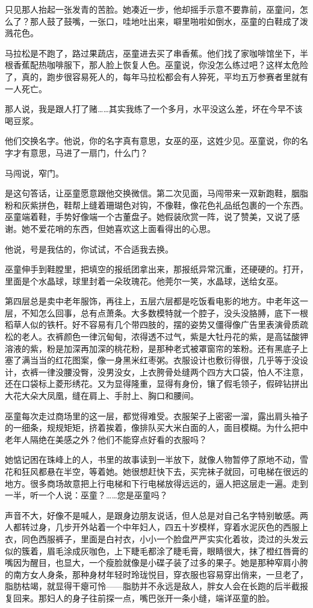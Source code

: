 \documentclass[lang=cn,newtx,12pt,scheme=chinese]{elegantbook}
\begin{document}
只见那人抬起一张发青的苦脸。她凑近一步，他却摇手示意不要靠前，巫童问，怎么了？那人鼓了鼓嘴，一张口，哇地吐出来，噼里啪啦如倒水，巫童的白鞋成了泼溅花色。

马拉松是不跑了，路过果蔬店，巫童进去买了串香蕉。他们找了家咖啡馆坐下，半根香蕉配热咖啡服下，那人脸上恢复人色。巫童说，你没怎么练过吧？这样太危险了，真的，跑步很容易死人的，每年马拉松都会有人猝死，平均五万参赛者里就有一人死亡。

那人说，我是跟人打了赌……其实我练了一个多月，水平没这么差，坏在今早不该喝豆浆。

他们交换名字。他说，你的名字真有意思，女巫的巫，这姓少见。巫童说，你的名字才有意思，马进了一扇门，什么门？

马闯说，窄门。

是这句答话，让巫童愿意跟他交换微信。第二次见面，马闯带来一双新跑鞋，胭脂粉和灰紫拼色，鞋帮上缝着珊瑚色对钩，不像鞋，像花色礼品纸包裹的一个东西。巫童端着鞋，手势好像端一个古董盘子。她假装欣赏一阵，说了赞美，又说了感谢。她不爱花哨的东西，但她喜欢这上面看得出的心思。

他说，号是我估的，你试试，不合适我去换。

巫童伸手到鞋膛里，把填空的报纸团拿出来，那报纸异常沉重，还硬硬的。打开，里面是个水晶球，球里封着一朵玫瑰花。他莞尔一笑，水晶球，送给女巫。

第四层总是卖中老年服饰，再往上，五层六层都是吃饭看电影的地方。中老年这一层，不知怎么回事，总有点萧条。大多数模特就一个腔子，没头没胳膊，底下一根稻草人似的铁杆。好不容易有几个带四肢的，摆的姿势又僵得像广告里表演骨质疏松的老人。衣裤颜色一律沉甸甸，浓得透不过气，紫是大牡丹花的紫，是高锰酸钾溶液的紫，粉是加深再加深的桃花粉，是那种老式被罩窗帘的笨粉。还有黑底子上塞了满当当的红花图案，像一身黑米红枣粥。衣服设计也敷衍得很，几乎等于没设计，衣裤一律没腰没臀，没男没女，上衣胯骨处缝两个四方大口袋，怕人不注意，还在口袋标上菱形绣花。又为显得隆重，显得有身份，镶了假毛领子，假碎钻拼出大花大朵大凤凰，缝在肩上、手肘上、胸口和腰间。

巫童每次走过商场里的这一层，都觉得难受。衣服架子上密密一溜，露出肩头袖子的一细条，规规矩矩，挤着挨着，像排队买大米白面的人，面目模糊。为什么把中老年人隔绝在美感之外？他们不能穿点好看的衣服吗？

她惦记困在珠峰上的人，书里的故事读到一半放下，就像人物暂停了原地不动，雪花和狂风都悬在半空，等着她。她很想赶快下去，买完袜子就回，可电梯在很远的地方。很多商场故意把上行电梯和下行电梯放得远远的，逼人把这层走一遍。走到一半，听一个人说：巫童？……您是巫童吗？

声音不大，好像不是喊人，是跟身边朋友说话，但人总是对自己名字特别敏感。两人都转过身，几步开外站着一个中年妇人，四五十岁模样，穿着水泥灰色的西服上衣，同色西服裤子，里面是白衬衣，小小一个脸盘严严实实化着妆，烫过的头发云似的簇着，眉毛涂成灰咖色，上下睫毛都涂了睫毛膏，眼睛很大，抹了橙红唇膏的嘴因为醒目，也显大，一个瘦脸就像是小碟子装了过多的果子。她是那种窄肩小胯的南方女人身条，那种身材年轻时玲珑悦目，穿衣服也容易穿出俏来，一旦老了，脂肪枯竭，就显得干瘪可怜——脂肪并不永远是敌人，胖女人会在长跑的后半截报复回来。那妇人的身子往前探一点，嘴巴张开一条小缝，端详巫童的脸。
\end{document}
